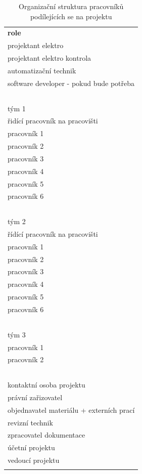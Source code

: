 \documentclass[a4paper, twoside, 11pt]{article}
\begin{document}
		\begin{table}[H]
		
			\begin{tabular}{ !{\vrule width 2pt} l !{\vrule width 2pt} }
				\textbf{role} \\ 
				projektant elektro \\ \hline
				projektant elektro kontrola \\ \hline
				automatizační technik \\ \hline
				software developer - pokud bude potřeba \\ \hline
				\  \\ \hline
				tým 1 \\ \hline
				řidící pracovník na pracovišti \\ \hline
				pracovník 1 \\ \hline
				pracovník 2 \\ \hline
				pracovník 3 \\ \hline
				pracovník 4 \\ \hline
				pracovník 5 \\ \hline
				pracovník 6 \\ \hline
				\  \\ \hline
				tým 2 \\ \hline
				řídící pracovník na pracovišti \\ \hline
				pracovník 1 \\ \hline
				pracovník 2 \\ \hline
				pracovník 3 \\ \hline
				pracovník 4 \\ \hline
				pracovník 5 \\ \hline
				pracovník 6 \\ \hline
				\  \\ \hline
				tým 3 \\ \hline
				pracovník 1 \\ \hline
				pracovník 2 \\ \hline
				\  \\ \hline
				kontaktní osoba projektu \\ \hline
				právní zařizovatel \\ \hline
				objednavatel materiálu + externích prací \\ \hline
				revizní technik \\ \hline
				zpracovatel dokumentace \\ \hline
				účetní projektu \\ \hline
				vedoucí projektu\\ 
		
			\end{tabular}
		\caption{Organizační struktura pracovníků podílejících se na projektu}
		\end{table}
		
\end{document}
